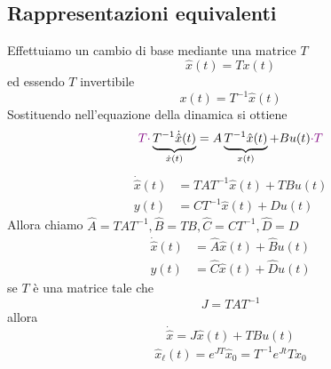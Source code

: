 \documentclass{article}
\numberwithin{equation}{subsection}
\let\oldsubsection\subsection%
\renewcommand{\subsection}{%
  \renewcommand{\theequation}{\thesubsection.\arabic{equation}}%
  \oldsubsection}%
\begin{document}
\subsection{Rappresentazioni equivalenti}
Effettuiamo un cambio di base mediante una matrice $T$
\begin{equation}
    \hat x(t) = T x(t)
\end{equation}
ed essendo $T$ invertibile
\begin{equation}
    x(t) = T^{-1} \hat x(t)
\end{equation}
Sostituendo nell'equazione della dinamica si ottiene
\begin{align*}
    {\color{violet} T \cdot} \underbrace{T^{-1} \dot{\hat x}(t)}_{\dot x(t)} &= A \underbrace{T^{-1} \hat x(t)}_{x(t)} + B u(t) {\color{violet} \cdot T } \\
\end{align*}
\begin{align*}
    \dot{\hat x}(t) &= TAT^{-1} \hat x(t) + T B u(t)\\
    y(t) &= CT^{-1} \hat x(t) + D u(t)
\end{align*}
Allora chiamo $\hat A = TAT^{-1}, \hat B=TB, \hat C = CT^{-1}, \hat D = D$
\begin{align*}
    \dot{\hat x}(t)  &= \hat A \hat x(t) + \hat B u(t)\\
    y(t) &= \hat C \hat x(t) + \hat D u(t)
\end{align*}
se $T$ è una matrice tale che
\begin{equation}
    J = TAT^{-1}
\end{equation}
allora
\begin{equation}
    \dot{\hat x} = J \hat x(t) + T B u(t)
\end{equation}
\begin{align*}
    \hat x_\ell (t) = e^{JT} \hat x_0 = T^{-1} e^{Jt}T x_0
\end{align*}
\end{document}
